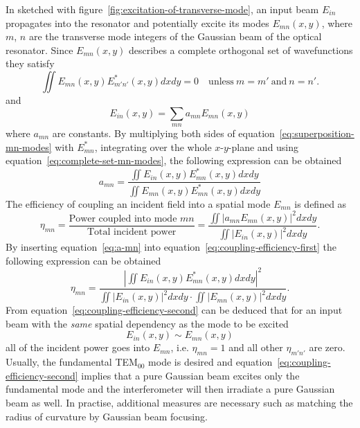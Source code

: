 In sketched with figure~\ref{fig:excitation-of-transverse-mode}, an input beam $E_{in}$ propagates into the resonator and potentially excite its modes $E_{mn}(x,y)$, where $m$, $n$ are the transverse mode integers of the Gaussian beam of the optical resonator.
Since $E_{mn}(x,y)$ describes a complete orthogonal set of wavefunctions they satisfy
\begin{equation}
\label{eq:complete-set-mn-modes}
\iint E_{mn}(x,y) E^*_{m'n'}(x,y) dx dy = 0 \quad \mathrm{unless} \ m=m' \ \mathrm{and} \ n=n'.
\end{equation}
and
\begin{equation}
\label{eq:superposition-mn-modes}
E_{in}(x,y) = \sum_{mn}a_{mn}E_{mn}(x,y)
\end{equation}
where $a_{mn}$ are constants.
By multiplying both sides of equation~\eqref{eq:superposition-mn-modes} with $E_{mn}^*$, integrating over the whole $x$-$y$-plane and using equation~\eqref{eq:complete-set-mn-modes}, the following expression can be obtained
\begin{equation}
\label{eq:a-mn}
a_{mn}=\frac{\iint E_{in}(x,y)E^*_{mn}(x,y) dx dy}{\iint E_{mn}(x,y)E^*_{mn}(x,y) dx dy}
\end{equation}
The efficiency of coupling an incident field into a spatial mode $E_{mn}$ is defined as
\begin{equation}
\label{eq:coupling-efficiency-first}
\eta_{mn}=\frac{\textrm{Power coupled into mode } mn}{\textrm{Total incident power}}=
\frac{\iint \left|a_{mn} E_{mn}(x,y)\right|^2 dx dy}{\iint \left|E_{in}(x,y)\right|^2 dx dy}.
\end{equation}
By inserting equation~\eqref{eq:a-mn} into equation~\eqref{eq:coupling-efficiency-first} the following expression can be obtained
\begin{equation}
\label{eq:coupling-efficiency-second}
\eta_{mn}= \frac{\left|\iint E_{in}(x,y)E^*_{mn}(x,y) dx dy\right|^2}{\iint \left|E_{in}(x,y)\right|^2 dx dy \cdot \iint \left|E_{mn}(x,y)\right|^2 dx dy}.
\end{equation}
From equation~\eqref{eq:coupling-efficiency-second} can be deduced that for an input beam with the \textit{same} spatial dependency as the mode to be excited
\begin{equation}
E_{in}(x,y) \sim E_{mn}(x,y)
\end{equation}
all of the incident power goes into $E_{mn}$, i.e. $\eta_{mn}=1$ and all other $\eta_{m'n'}$ are zero.
Usually, the fundamental TEM$_{00}$ mode is desired and equation~\eqref{eq:coupling-efficiency-second} implies that a pure Gaussian beam excites only the fundamental mode and the interferometer will then irradiate a pure Gaussian beam as well.
In practise, additional measures are necessary such as matching the radius of curvature by Gaussian beam focusing.

